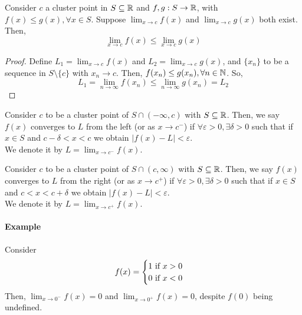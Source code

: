 \begin{theorem}
    Consider $c$ a cluster point in $S \subseteq \mathbb{R}$ and $f,g: S \to \mathbb{R}$, with $f(x) \leq g(x), \forall x \in S$. Suppose $\lim_{x \to c} f(x)$ and $\lim_{x \to c} g(x)$ both exist. Then,
    \begin{equation*}
        \lim \limits_{x \to c} f(x) \leq \lim \limits_{x \to c} g(x)
    \end{equation*}
\end{theorem}

\begin{proof}
    Define $L_1 = \lim_{x \to c} f(x)$ and $L_2 = \lim_{x \to c} g(x)$, and $\{x_n\}$ to be a sequence in $S \setminus \{c\}$ with $x_n \to c$. Then, $f(x_n) \leq g(x_n), \forall n \in \mathbb{N}$. So,
    \begin{equation*}
        L_1 = \lim \limits_{n \to \infty} f(x_n) \leq \lim \limits_{n \to \infty} g(x_n) = L_2
    \end{equation*}
\end{proof}

\begin{definition}
    Consider $c$ to be a cluster point of $S \cap (-\infty, c)$ with $S \subseteq \mathbb{R}$. Then, we say $f(x)$ converges to $L$ from the left (or as $x \to c^-$) if $\forall \varepsilon > 0, \exists \delta >0$ such that if $x \in S$ and $c - \delta < x < c$ we obtain $|f(x) - L| < \varepsilon$. \\
    We denote it by $L = \lim_{x \to c^-} f(x)$.
\end{definition}

\begin{definition}
    Consider $c$ to be a cluster point of $S \cap (c, \infty)$ with $S \subseteq \mathbb{R}$. Then, we say $f(x)$ converges to $L$ from the right (or as $x \to c^+$) if $\forall \varepsilon > 0, \exists \delta >0$ such that if $x \in S$ and $c < x < c + \delta$ we obtain $|f(x) - L| < \varepsilon$. \\
    We denote it by $L = \lim_{x \to c^+} f(x)$.
\end{definition}

\paragraph{Example} Consider
\begin{equation*}
    f(x) = \begin{cases}
    1 \textnormal{ if } x > 0 \\
    0 \textnormal{ if } x < 0
    \end{cases}
\end{equation*}
Then, $\lim_{x \to 0^-} f(x) = 0$ and $\lim_{x \to 0^+} f(x) = 0$, despite $f(0)$ being undefined.

